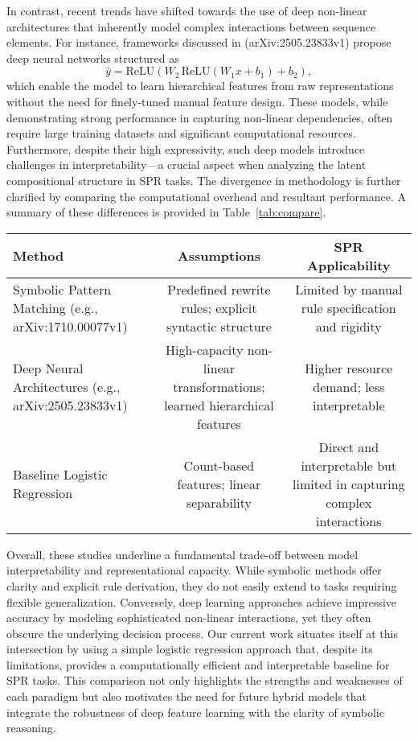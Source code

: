 \documentclass{article}
\begin{document}
In contrast, recent trends have shifted towards the use of deep non-linear architectures that inherently model complex interactions between sequence elements. For instance, frameworks discussed in (arXiv:2505.23833v1) propose deep neural networks structured as
\[
\hat{y} = \text{ReLU}(W_2\, \text{ReLU}(W_1 x + b_1) + b_2),
\]
which enable the model to learn hierarchical features from raw representations without the need for finely-tuned manual feature design. These models, while demonstrating strong performance in capturing non-linear dependencies, often require large training datasets and significant computational resources. Furthermore, despite their high expressivity, such deep models introduce challenges in interpretability—a crucial aspect when analyzing the latent compositional structure in SPR tasks. The divergence in methodology is further clarified by comparing the computational overhead and resultant performance. A summary of these differences is provided in Table~\ref{tab:compare}.

\begin{center}
\begin{tabular}{|l|c|c|}
\hline
\textbf{Method} & \textbf{Assumptions} & \textbf{SPR Applicability} \\
\hline
Symbolic Pattern Matching (e.g., arXiv:1710.00077v1) & Predefined rewrite rules; explicit syntactic structure & Limited by manual rule specification and rigidity \\
\hline
Deep Neural Architectures (e.g., arXiv:2505.23833v1) & High-capacity non-linear transformations; learned hierarchical features & Higher resource demand; less interpretable \\
\hline
Baseline Logistic Regression & Count-based features; linear separability & Direct and interpretable but limited in capturing complex interactions \\
\hline
\end{tabular}
\end{center}

Overall, these studies underline a fundamental trade-off between model interpretability and representational capacity. While symbolic methods offer clarity and explicit rule derivation, they do not easily extend to tasks requiring flexible generalization. Conversely, deep learning approaches achieve impressive accuracy by modeling sophisticated non-linear interactions, yet they often obscure the underlying decision process. Our current work situates itself at this intersection by using a simple logistic regression approach that, despite its limitations, provides a computationally efficient and interpretable baseline for SPR tasks. This comparison not only highlights the strengths and weaknesses of each paradigm but also motivates the need for future hybrid models that integrate the robustness of deep feature learning with the clarity of symbolic reasoning.
\end{document}

